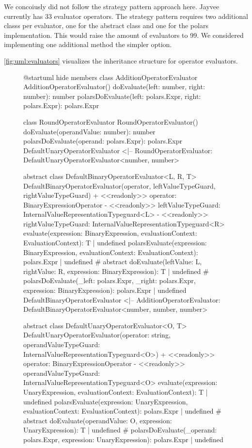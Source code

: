 We concoiusly did not follow the strategy pattern approach here.
Jayvee currently has 33 evaluator operators.
The strategy pattern requires two additional classs per evaluator, one for the abstract class and one for the polars implementation.
This would raise the amount of evaluators to 99.
We considered implementing one additional method the simpler option.

\ref{fig:uml:evaluators} visualizes the inheritance structure for operator evaluators.

\begin{figure}
	\begin{plantuml}
		@startuml
		hide members
		class AdditionOperatorEvaluator {
				AdditionOperatorEvaluator()
				doEvaluate(left: number, right: number): number
				polarsDoEvaluate(left: polars.Expr, right: polars.Expr): polars.Expr
			}

		class RoundOperatorEvaluator {
				RoundOperatorEvaluator()
				doEvaluate(operandValue: number): number
				polarsDoEvaluate(operand: polars.Expr): polars.Expr
			}
		DefaultUnaryOperatorEvaluator <|-- RoundOperatorEvaluator: DefaultUnaryOperatorEvaluator<number, number>

		abstract class DefaultBinaryOperatorEvaluator<L, R, T> {
		DefaultBinaryOperatorEvaluator(operator, leftValueTypeGuard, rightValueTypeGuard)
		+ <<readonly>> operator: BinaryExpressionOperator
		- <<readonly>> leftValueTypeGuard: InternalValueRepresentationTypeguard<L>
		- <<readonly>> rightValueTypeGuard: InternalValueRepresentationTypeguard<R>
		evaluate(expression: BinaryExpression, evaluationContext: EvaluationContext): T | undefined
		polarsEvaluate(expression: BinaryExpression, evaluationContext: EvaluationContext): polars.Expr | undefined
		# {abstract} doEvaluate(leftValue: L, rightValue: R, expression: BinaryExpression): T | undefined
		# polarsDoEvaluate(_left: polars.Expr, _right: polars.Expr, expression: BinaryExpression): polars.Expr | undefined
		}
		DefaultBinaryOperatorEvaluator <|-- AdditionOperatorEvaluator: DefaultBinaryOperatorEvaluator<number, number, number>

		abstract class DefaultUnaryOperatorEvaluator<O, T> {
		DefaultUnaryOperatorEvaluator(operator: string, operandValueTypeGuard: InternalValueRepresentationTypeguard<O>)
		+ <<readonly>> operator: BinaryExpressionOperator
		- <<readonly>> operandValueTypeGuard: InternalValueRepresentationTypeguard<O>
		evaluate(expression: UnaryExpression, evaluationContext: EvaluationContext): T | undefined
		polarsEvaluate(expression: UnaryExpression, evaluationContext: EvaluationContext): polars.Expr | undefined
		# {abstract} doEvaluate(operandValue: O, expression: UnaryExpression): T | undefined
		# polarsDoEvaluate(_operand: polars.Expr, expression: UnaryExpression): polars.Expr | undefined
		}


\end{plantuml}
\end{figure}
